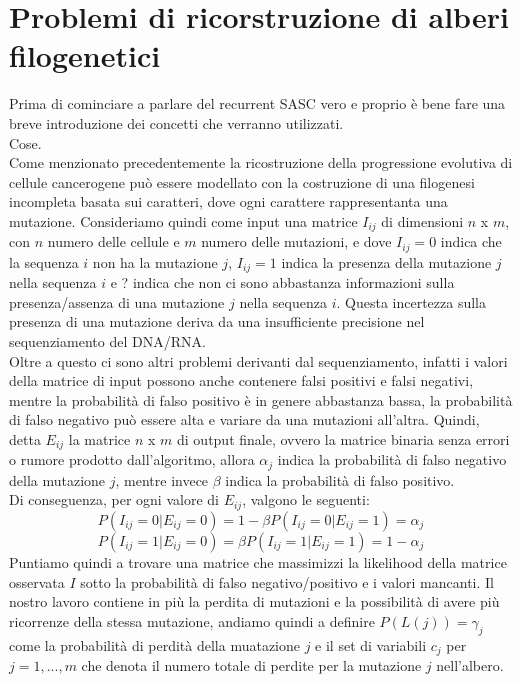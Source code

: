 \documentclass{report}
\begin{document}
\section{Problemi di ricorstruzione di alberi filogenetici}
  Prima di cominciare a parlare del recurrent SASC vero e proprio è bene fare una breve introduzione dei concetti che verranno utilizzati.\\
  Cose.\\
  Come menzionato precedentemente la ricostruzione della progressione evolutiva di cellule cancerogene può essere modellato con la costruzione di una filogenesi incompleta basata sui caratteri, dove ogni carattere rappresentanta una mutazione.
  Consideriamo quindi come input una matrice  ${I}_{ij}$ di dimensioni $n$ x $m$, con $n$ numero delle cellule e $m$ numero delle mutazioni, e dove ${I}_{ij} = 0$ indica che la sequenza $i$ non ha la mutazione $j$, ${I}_{ij} = 1$ indica la presenza della mutazione $j$ nella sequenza $i$ e ? indica che non ci sono abbastanza informazioni sulla presenza/assenza di una mutazione $j$ nella sequenza $i$. Questa incertezza sulla presenza di una mutazione deriva da una insufficiente precisione nel sequenziamento del DNA/RNA.\\
  Oltre a questo ci sono altri problemi derivanti dal sequenziamento, infatti i valori della matrice di input possono anche contenere falsi positivi e falsi negativi, mentre la probabilità di falso positivo è in genere abbastanza bassa, la probabilità di falso negativo può essere alta e variare da una mutazioni all'altra.
  Quindi, detta $E_{ij}$ la matrice $n$ x $m$ di output finale, ovvero la matrice binaria senza errori o rumore prodotto dall'algoritmo, allora ${\alpha}_{j}$ indica la probabilità di falso negativo della mutazione $j$, mentre invece $\beta$ indica la probabilità di falso positivo.\\
  Di conseguenza, per ogni valore di ${E}_{ij}$, valgono le seguenti:
  \[
    P(I_{ij} = 0|{E}_{ij} = 0) = 1 - \beta P(I_{ij} = 0|E_{ij} = 1) = \alpha_{j}
  \]
  \[
    P(I_{ij} = 1|E_{ij} = 0) = \beta P(I_{ij} = 1|E_{ij} = 1) = 1 - \alpha_{j}
  \]
  Puntiamo quindi a trovare una matrice che massimizzi la likelihood della matrice osservata $I$ sotto la probabilità di falso negativo/positivo e i valori mancanti.
  Il nostro lavoro contiene in più la perdita di mutazioni e la possibilità di avere più ricorrenze della stessa mutazione, andiamo quindi a definire $P(L(j))={\gamma}_{j}$ come la probabilità di perdità della muatazione $j$ e il set di variabili ${c}_{j}$ per $j=1,...,m$ che denota il numero totale di perdite per la mutazione $j$ nell'albero.
\end{document}
